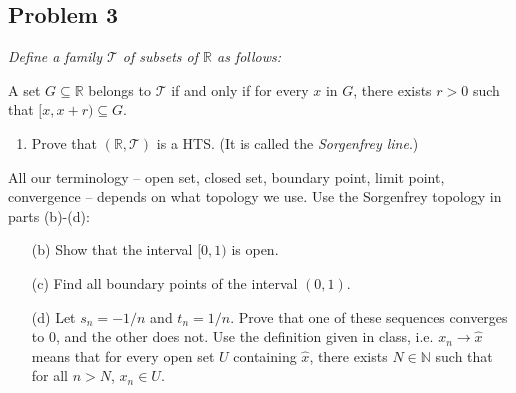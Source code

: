 \documentclass{article}
\newcommand{\N}{{\mathbb N}}
\newcommand{\R}{{\mathbb R}}
\begin{document}
\subsection*{Problem 3}
{\it Define a family $\mathcal{T}$ of subsets of $\R$ as follows:
	\begin{center}
		A set $G \subseteq \R$ belongs to $\mathcal{T}$ if and only if
		for every $x$ in $G$, there exists $r>0$ such that $[x,x+r)\subseteq G$.
	\end{center}
	\begin{enumerate}
		\item Prove that $(\R,\mathcal{T})$ is a HTS. (It is called the \emph{Sorgenfrey line}.)
	\end{enumerate}
	All our terminology -- open set, closed set, boundary point, limit point, convergence
	-- depends on what topology we use. Use the Sorgenfrey topology in parts (b)-(d):
	\begin{enumerate}
		\item[(b)] Show that the interval $[0,1)$ is open.
		\item[(c)] Find all boundary points of the interval $(0,1)$.
		\item[(d)] Let $s_n = -1/n$ and $t_n=1/n$.
			Prove that one of these sequences converges to $0$, and the other does not.
			Use the definition given in class, i.e. $x_n \to \hat{x}$
			means that for every open set $U$ containing $\hat{x}$,
			there exists $N \in \N$ such that for all $n > N$, $x_n \in U$.
\end{enumerate}}
\end{document}
